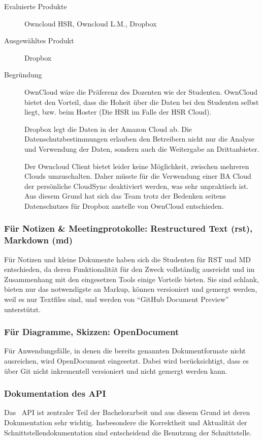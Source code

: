 				\begin{description}
					\item[Evaluierte Produkte] Owncloud HSR, Owncloud L.M., Dropbox
					\item[Ausgewähltes Produkt] Dropbox
					\item[Begründung] OwnCloud wäre die Präferenz des Dozenten wie der Studenten. 
						OwnCloud bietet den Vorteil, dass die Hoheit über die Daten bei den Studenten selbst liegt, bzw. beim Hoster (Die HSR im Falle der HSR Cloud).
						
						Dropbox legt die Daten in der Amazon Cloud ab. 
						Die Datenschutzbestimmungen erlauben den Betreibern nicht nur die Analyse und Verwendung der Daten, 
						sondern auch die Weitergabe an Drittanbieter.
						
						Der Owncloud Client bietet leider keine Möglichkeit, 
						zwischen mehreren Clouds umzuschalten. 
						Daher müsste für die Verwendung einer BA Cloud der persönliche CloudSync deaktiviert werden, 
						was sehr unpraktisch ist.						
						Aus diesem Grund hat sich das Team trotz der Bedenken seitens Datenschutzes für Dropbox anstelle von OwnCloud entschieden.
				\end{description}

			\subsubsection{Für Notizen \& Meetingprotokolle: Restructured Text (rst), Markdown (md)}
				Für Notizen und kleine Dokumente haben sich die Studenten für RST und MD entschieden, 
				da deren Funktionalität für den Zweck vollständig ausreicht und im Zusammenhang mit den eingesetzen Tools einige Vorteile bieten. 
				Sie sind schlank, bieten nur das notwendigste an Markup, können versioniert und gemergt werden,
				weil es nur Textfiles sind, und werden von "`GitHub Document Preview"' unterstützt.

			\subsubsection{Für Diagramme, Skizzen: OpenDocument}
				Für Anwendungsfälle, in denen die bereits genannten Dokumentformate nicht ausreichen, 
				wird OpenDocument eingesetzt. Dabei wird berücksichtigt, 
				dass es über Git nicht inkrementell versioniert und nicht
				gemergt werden kann.
				
			\subsubsection{Dokumentation des API}
				Das \eeppi\ API ist zentraler Teil der Bachelorarbeit und aus diesem Grund ist deren Dokumentation sehr wichtig. Insbesondere die Korrektheit und Aktualität der Schnittstellendokumentation sind entscheidend die Benutzung der Schnittstelle.
				
